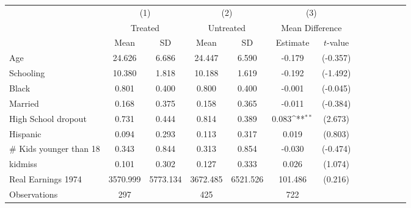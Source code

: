 {
\def\sym#1{\ifmmode^{#1}\else\(^{#1}\)\fi}
\begin{tabular}{l*{3}{cccc}}
\hline\hline
                    &\multicolumn{2}{c}{(1)}  &\multicolumn{2}{c}{(2)}  &\multicolumn{2}{c}{(3)}           \\
                    &\multicolumn{2}{c}{Treated}&\multicolumn{2}{c}{Untreated}&\multicolumn{2}{c}{Mean Difference}\\
                    & Mean & SD & Mean & SD & Estimate & $t$-value \\
\hline
Age   &      24.626&       6.686&      24.447&       6.590&      -0.179         &    (-0.357)\\
Schooling  &      10.380&       1.818&      10.188&       1.619&      -0.192         &    (-1.492)\\
Black &       0.801&       0.400&       0.800&       0.400&      -0.001         &    (-0.045)\\
Married &       0.168&       0.375&       0.158&       0.365&      -0.011         &    (-0.384)\\
High School dropout &       0.731&       0.444&       0.814&       0.389&       0.083\sym{**} &     (2.673)\\
Hispanic&       0.094&       0.293&       0.113&       0.317&       0.019         &     (0.803)\\
\# Kids younger than 18&       0.343&       0.844&       0.313&       0.854&      -0.030         &    (-0.474)\\
kidmiss             &       0.101&       0.302&       0.127&       0.333&       0.026         &     (1.074)\\
Real Earnings 1974  &    3570.999&    5773.134&    3672.485&    6521.526&     101.486         &     (0.216)\\
\hline
Observations        &         297&            &         425&            &         722         &            \\
\hline\hline
\end{tabular}
}
